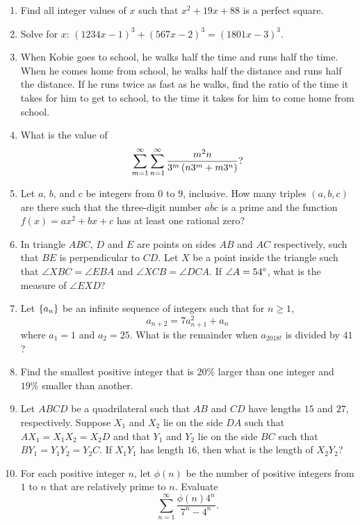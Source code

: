\documentclass[11pt,paper=letter]{scrartcl}
\begin{document}
\begin{enumerate}
  \item[10.] Find all integer values of $x$ such that $x^2 + 19x + 88$ is a perfect square.

  \item[9.] Solve for $x$: $(1234x-1)^3+(567x-2)^3=(1801x-3)^3$.

  \item[8.] When Kobie goes to school, he walks half the time and runs half the time. When he comes home from school, he walks half the distance and runs half the distance. If he runs twice as fast as he walks, find the ratio of the time it takes for him to get to school, to the time it takes for him to come home from school.

  \item[7.] What is the value of $$\sum_{m=1}^{\infty} \sum_{n=1}^{\infty} \frac{m^2n}{3^m \left( n3^m + m3^n \right)}?$$

  \item[6.] Let $a$, $b$, and $c$ be integers from $0$ to $9$, inclusive. How many triples $(a, b, c)$ are there such that the three-digit number $\overline{abc}$ is a prime and the function $f(x) = ax^2 + bx + c$ has at least one rational zero?

  \item[5.] In triangle $ABC$, $D$ and $E$ are points on sides $AB$ and $AC$ respectively, such that $BE$ is perpendicular to $CD$. Let $X$ be a point inside the triangle such that $\angle XBC = \angle EBA$ and $\angle XCB = \angle DCA$. If $\angle A = 54^\circ$, what is the measure of $\angle EXD$?

  \item[4.] Let $\left\{ a_n \right\}$ be an infinite sequence of integers such that for $n \geq 1$, $$a_{n+2} = 7a_{n+1}^2 + a_n$$ where $a_1 = 1$ and $a_2 = 25$. What is the remainder when $a_{2018!}$ is divided by $41$?

  \item[3.] Find the smallest positive integer that is $20\%$ larger than one integer and $19\%$ smaller than another.

  \item[2.] Let $ABCD$ be a quadrilateral such that $AB$ and $CD$ have lengths $15$ and $27$, respectively. Suppose $X_1$ and $X_2$ lie on the side $DA$ such that $AX_1 = X_1X_2 = X_2D$ and that $Y_1$ and $Y_2$ lie on the side $BC$ such that $BY_1 = Y_1Y_2 = Y_2C$. If $X_1Y_1$ has length $16$, then what is the length of $X_2Y_2$?

  \item[1.] For each positive integer $n$, let $\phi(n)$ be the number of positive integers from $1$ to $n$ that are relatively prime to $n$. Evaluate $$\sum_{n=1}^{\infty} \frac{\phi(n)4^n}{7^n - 4^n}.$$
\end{enumerate}
\end{document}
